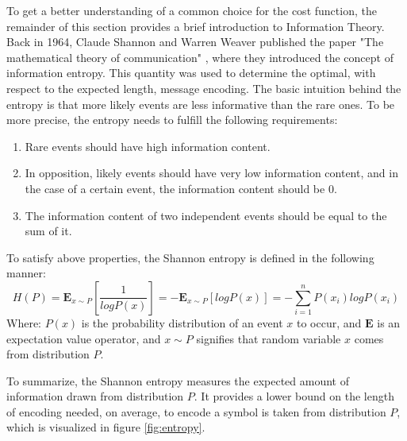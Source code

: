 To get a better understanding of a common choice for the cost function, the remainder of this section provides a brief introduction to Information Theory.
Back in 1964, Claude Shannon and Warren Weaver published the paper "The mathematical theory of communication" \cite{Shannon}, where they introduced the concept of information entropy. This quantity was used to determine the optimal, with respect to the expected length,  message encoding. The basic intuition behind the entropy is that more likely events are less informative than the rare ones. To be more precise, the entropy needs to fulfill the following requirements:
\begin{enumerate}
\item Rare events should have high information content. 
\item In opposition, likely events should have very low information content, and in the case of a certain event, the information content should be $0$. 
\item The information content of two independent events should be equal to the sum of it. 
\end{enumerate}
To satisfy above properties, the Shannon entropy is defined in the following manner:  
\begin{equation}\label{eq:entropy}
H(P) =\mathbf{E}_{x\sim P}\left[\frac{1}{log P(x)} \right] = - \mathbf{E}_{x\sim P}[log P(x)] = - \sum_{i=1}^{n} P(x_i)log P(x_i)
\end{equation}
Where: $P(x)$ is the probability distribution of an event $x$ to occur, and $\mathbf{E}$ is an expectation value operator, and $x \sim P$ signifies that random variable $x$ comes from distribution $P$. 

To summarize, the Shannon entropy measures the expected amount of information drawn from distribution $P$. It provides a lower bound on the length of encoding needed, on average, to encode a symbol is taken from distribution $P$, which is visualized in figure \ref{fig:entropy}.


